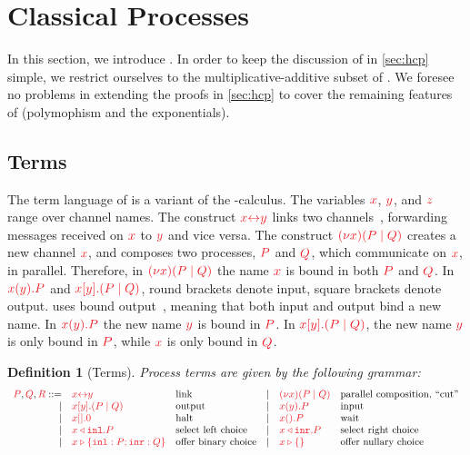 \documentclass[submission,copyright,creativecommons]{eptcs}
\newtheorem{definition}[lemma]{Definition}
\begin{document}
\section{Classical Processes}
\label{sec:cp}

In this section, we introduce \cp. In order to keep the discussion of \hcp in \cref{sec:hcp} simple, we restrict ourselves to the multiplicative-additive subset of \cp. We foresee no problems in extending the proofs in \cref{sec:hcp} to cover the remaining features of \cp (polymophism and the exponentials).

\subsection{Terms}
The term language of \cp is a variant of the \textpi-calculus. The variables $\tm{x}$, $\tm{y}$, and $\tm{z}$ range over channel names. The construct $\tm{\cpLink{x}{y}}$ links two channels~\citep{sangiorgi1996,boreale1998}, forwarding messages received on $\tm{x}$ to $\tm{y}$ and vice versa. The construct $\tm{\cpCut{x}{P}{Q}}$ creates a new channel $\tm{x}$, and composes two processes, $\tm{P}$ and $\tm{Q}$, which communicate on $\tm{x}$, in parallel. Therefore, in $\tm{\cpCut{x}{P}{Q}}$ the name $\tm{x}$ is bound in both $\tm{P}$ and $\tm{Q}$. In $\tm{\cpRecv{x}{y}{P}}$ and $\tm{\cpSend{x}{y}{P}{Q}}$, round brackets denote input, square brackets denote output. \cp uses bound output~\citep{sangiorgi1996}, meaning that both input and output bind a new name. In $\tm{\cpRecv{x}{y}{P}}$ the new name $\tm{y}$ is bound in $\tm{P}$. In $\tm{\cpSend{x}{y}{P}{Q}}$, the new name $\tm{y}$ is only bound in $\tm{P}$, while $\tm{x}$ is only bound in $\tm{Q}$.
\begin{definition}[Terms]\label{def:cp-terms}
  Process terms are given by the following grammar:
  \[
    \begin{array}{rllrll}
      \tm{P}, \tm{Q}, \tm{R}
           ::= & \tm{\cpLink{x}{y}}       &\text{link}
      &  \mid& \tm{\cpCut{x}{P}{Q}}     &\text{parallel composition, ``cut''}
      \\ \mid& \tm{\cpSend{x}{y}{P}{Q}} &\text{output}
      &  \mid& \tm{\cpRecv{x}{y}{P}}    &\text{input}
      \\ \mid& \tm{\cpHalt{x}}          &\text{halt}
      &  \mid& \tm{\cpWait{x}{P}}       &\text{wait}
      \\ \mid& \tm{\cpInl{x}{P}}        &\text{select left choice}
      &  \mid& \tm{\cpInr{x}{P}}        &\text{select right choice}
      \\ \mid& \tm{\cpCase{x}{P}{Q}}    &\text{offer binary choice}
      &  \mid& \tm{\cpAbsurd{x}}        &\text{offer nullary choice}
    \end{array}
  \]
\end{definition}\noindent
\end{document}
